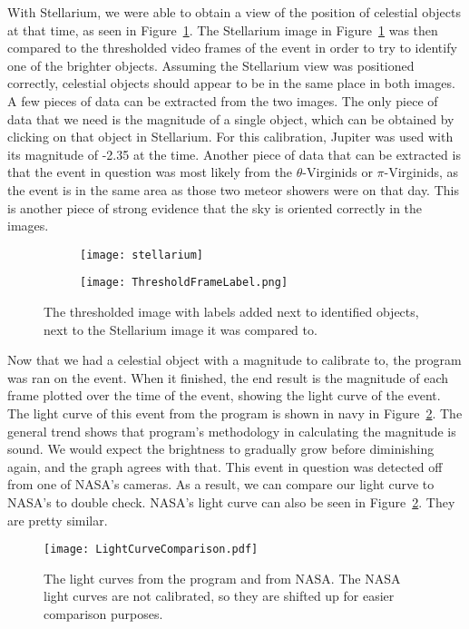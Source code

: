 With Stellarium, we were able to obtain a view of the position of celestial objects at that time, as seen in Figure~\ref{fig:Starposition}. The Stellarium image in Figure~\ref{fig:Starposition} was then compared to the thresholded video frames of the event in order to try to identify one of the brighter objects. Assuming the Stellarium view was positioned correctly, celestial objects should appear to be in the same place in both images. A few pieces of data can be extracted from the two images. The only piece of data that we need is the magnitude of a single object, which can be obtained by clicking on that object in Stellarium. For this calibration, Jupiter was used with its magnitude of -2.35 at the time. Another piece of data that can be extracted is that the event in question was most likely from the $\theta$-Virginids or $\pi$-Virginids, as the event is in the same area as those two meteor showers were on that day. This is another piece of strong evidence that the sky is oriented correctly in the images.

\begin{figure}
\centering
\begin{subfigure}{.4\textwidth}
	\centering
	\texttt{[image: stellarium]}
\end{subfigure}%
\begin{subfigure}{.4\textwidth}
	\centering
	\texttt{[image: ThresholdFrameLabel.png]}
\end{subfigure}
\caption{The thresholded image with labels added next to identified objects, next to the Stellarium image it was compared to.}
\label{fig:Starposition}
\end{figure}

Now that we had a celestial object with a magnitude to calibrate to, the program was ran on the event. When it finished, the end result is the magnitude of each frame plotted over the time of the event, showing the light curve of the event. The light curve of this event from the program is shown in navy in Figure~\ref{fig:nasa}. The general trend shows that program's methodology in calculating the magnitude is sound. We would expect the brightness to gradually grow before diminishing again, and the graph agrees with that. This event in question was detected off from one of NASA's cameras. As a result, we can compare our light curve to NASA's to double check. NASA's light curve can also be seen in Figure~\ref{fig:nasa}. They are pretty similar.

\begin{figure}[ht!]
	\centering
	\texttt{[image: LightCurveComparison.pdf]}
	\caption{The light curves from the program and from NASA. The NASA light curves are not calibrated, so they are shifted up for easier comparison purposes.}
	\label{fig:nasa}
\end{figure}

